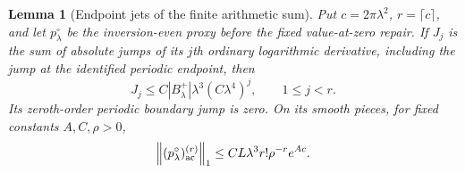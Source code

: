\documentclass[11pt]{article}
\newtheorem{lemma}[theorem]{Lemma}
\theoremstyle{remark}
\newcommand{\norm}[1]{\left\lVert #1\right\rVert}
\begin{document}
\begin{lemma}[Endpoint jets of the finite arithmetic sum]
\label{lem:v114-endpoint-jets}
Put $c=2\pi\lambda^2$, $r=\lceil c\rceil$, and let $p_\lambda^\circ$
be the inversion-even proxy before the fixed value-at-zero repair.
If $J_j$ is the sum of absolute jumps of its $j$th ordinary logarithmic
derivative, including the jump at the identified periodic endpoint, then
\begin{equation}\label{eq:v114-jet-bound}
 J_j\le C|B_\lambda^+|\lambda^3(C\lambda^4)^j,
          \qquad 1\le j<r.
\end{equation}
Its zeroth-order periodic boundary jump is zero. On its smooth pieces,
for fixed constants $A,C,\rho>0$,
\begin{equation}\label{eq:v114-smooth-remainder}
 \norm{(p_\lambda^\circ)^{(r)}_{\rm ac}}_1
       \le CL\lambda^3 r!\rho^{-r}e^{Ac}.
\end{equation}
\end{lemma}
\end{document}
